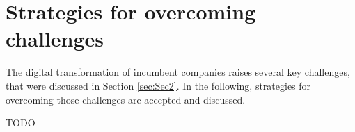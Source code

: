\documentclass[a4]{scrartcl}
\begin{document}
	










\newpage
\section{Strategies for overcoming challenges} \label{sec:Sec3}


The digital transformation of incumbent companies raises several key challenges, that were discussed in Section \ref{sec:Sec2}. In the following, strategies for overcoming those challenges are accepted and discussed.

TODO
\end{document}
